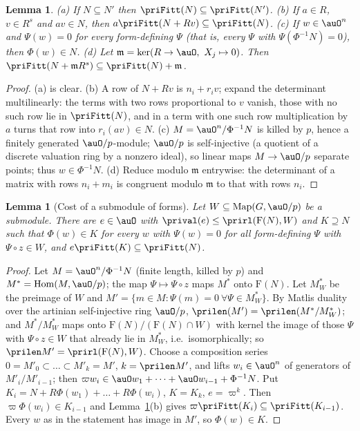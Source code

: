 \documentclass[10pt]{amsart}
\newtheorem{lemma}[theorem]{Lemma}
\theoremstyle{definition}
\theoremstyle{remark}
\begin{document}
\begin{lemma}\label{pri:fitt-basic}
(a) If $N\subseteq N'$ then $\priFitt(N)\subseteq\priFitt(N')$. (b) If $a\in R$, $v\in R^s$ and
$av\in N$, then $a\priFitt(N+Rv)\subseteq\priFitt(N)$. (c) If $w\in\auO^n$ and $\Psi(w)=0$ for every
form-defining $\Psi$ (that is, every $\Psi$ with $\Psi(\Phi^{-1}N)=0$), then $\Phi(w)\in N$.
(d) Let $\mathfrak m=\ker(R\to\auO,\ X_j\mapsto0)$. Then $\priFitt(N+\mathfrak mR^s)\subseteq
\priFitt(N)+\mathfrak m$.
\end{lemma}
\begin{proof}
(a) is clear. (b) A row of $N+Rv$ is $n_i+r_iv$; expand the determinant multilinearly: the terms
with two rows proportional to $v$ vanish, those with no such row lie in $\priFitt(N)$, and in a term
with one such row multiplication by $a$ turns that row into $r_i(av)\in N$. (c) $M=\auO^n/\Phi^{-1}N$
is killed by $p$, hence a finitely generated $\auO/p$-module; $\auO/p$ is self-injective (a
quotient of a discrete valuation ring by a nonzero ideal), so linear maps $M\to\auO/p$ separate
points; thus $w\in\Phi^{-1}N$. (d) Reduce modulo $\mathfrak m$ entrywise: the determinant of a matrix
with rows $n_i+m_i$ is congruent modulo $\mathfrak m$ to that with rows $n_i$.
\end{proof}

\begin{lemma}[Cost of a submodule of forms]\label{pri:fitt-cost}
Let $W\subseteq\operatorname{Map}(G,\auO/p)$ be a submodule. There are $e\in\auO$ with $\prival(e)\le
\prirl(\mathrm F(N),W)$ and $K\supseteq N$ such that $\Phi(w)\in K$ for every $w$ with $\Psi(w)=0$
for all form-defining $\Psi$ with $\Psi\circ z\in W$, and $e\priFitt(K)\subseteq\priFitt(N)$.
\end{lemma}
\begin{proof}
Let $M=\auO^n/\Phi^{-1}N$ (finite length, killed by $p$) and $M^*=\operatorname{Hom}(M,\auO/p)$; the
map $\Psi\mapsto\Psi\circ z$ maps $M^*$ onto $\mathrm F(N)$. Let $M^*_W$ be the preimage of $W$
and $M'=\{m\in M:\Psi(m)=0\ \forall\Psi\in M^*_W\}$. By Matlis duality over the artinian
self-injective ring $\auO/p$, $\prilen(M')=\prilen(M^*/M^*_W)$; and $M^*/M^*_W$ maps onto
$\mathrm F(N)/(\mathrm F(N)\cap W)$ with kernel the image of those $\Psi$ with $\Psi\circ z\in W$
that already lie in $M^*_W$, i.e.\ isomorphically; so $\prilen M'=\prirl(\mathrm F(N),W)$. Choose a
composition series $0=M'_0\subset\dots\subset M'_k=M'$, $k=\prilen M'$, and lifts $w_i\in\auO^n$ of
generators of $M'_i/M'_{i-1}$; then $\varpi w_i\in\auO w_1+\dots+\auO w_{i-1}+\Phi^{-1}N$. Put
$K_i=N+R\Phi(w_1)+\dots+R\Phi(w_i)$, $K=K_k$, $e=\varpi^k$. Then $\varpi\Phi(w_i)\in K_{i-1}$ and
Lemma~\ref{pri:fitt-basic}(b) gives $\varpi\priFitt(K_i)\subseteq\priFitt(K_{i-1})$. Every $w$ as in
the statement has image in $M'$, so $\Phi(w)\in K$.
\end{proof}
\end{document}
